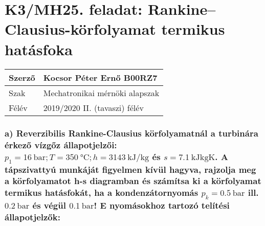 \pagebreak
\section*{K3/MH25. feladat: Rankine--Clausius-körfolyamat termikus hatásfoka}


\begin{tabular}{ | p{2cm} | p{14cm} | } 
	\hline
	Szerző & Kocsor Péter Ernő B00RZ7 \\ 
	\hline
	Szak & Mechatronikai mérnöki alapszak \\ 
	\hline
	Félév & 2019/2020 II. (tavaszi) félév \\ 
	\hline
\end{tabular}
\vspace{0.5cm}

\subsubsection*{a)  Reverzibilis Rankine-Clausius körfolyamatnál a turbinára érkező vízgőz állapotjelzői: $p_{1} =\SI{16}{\bar};T_{}=\SI{350}{\celsius};h= \SI{3143}{\kilo\joule\per\kilo\gram}$ és $s=\SI{7.1}{\kilo\joule\kilo\gram\kelvin}$. A tápszivattyú munkáját figyelmen kívül hagyva, rajzolja meg a körfolyamatot h-s diagramban és számítsa ki a körfolyamat termikus hatásfokát, ha a kondenzátornyomás $p_{k}= \SI{0.5}{\bar}$ ill. $\SI{0.2}{\bar}$ és végül $\SI{0.1}{\bar}$! E nyomásokhoz tartozó telítési állapotjelzők:}

